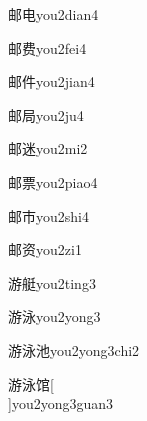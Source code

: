 \begin{verbete*}[7;5]{邮电}{you2dian4}
\end{verbete*}

\begin{verbete}[7;9]{邮费}{you2fei4}
\end{verbete}

\begin{verbete}[7;6]{邮件}{you2jian4}
\end{verbete}

\begin{verbete}[7;7]{邮局}{you2ju4}
\end{verbete}

\begin{verbete}[7;9]{邮迷}{you2mi2}
\end{verbete}

\begin{verbete}[7;11]{邮票}{you2piao4}
\end{verbete}

\begin{verbete}[7;5]{邮市}{you2shi4}
\end{verbete}

\begin{verbete}[7;10]{邮资}{you2zi1}
\end{verbete}

\begin{verbete}[12;12]{游艇}{you2ting3}
\end{verbete}

\begin{verbete}[12;8]{游泳}{you2yong3}
\end{verbete}

\begin{verbete}[12;8;6]{游泳池}{you2yong3chi2}
\end{verbete}

\begin{verbete}[12;8;11]{游泳馆}[\\]{you2yong3guan3}
\end{verbete}


